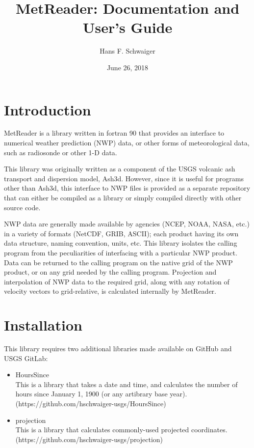 \documentclass[11pt]{article}   %
\begin{document}
\title{MetReader: Documentation and User's Guide}   %
\author{Hans F. Schwaiger}
\date{June 26, 2018}    %
\maketitle

\section{Introduction}
MetReader is a library written in fortran 90 that provides an interface to
numerical weather prediction (NWP) data, or other forms of meteorological
data, such as radiosonde or other 1-D data.

This library was originally written as a component of the USGS volcanic ash
transport and dispersion model, Ash3d.  However, since it is useful for
programs other than Ash3d, this interface to NWP files is provided
as a separate repository that can either be compiled as a library or simply
compiled directly with other source code.

NWP data are generally made available by agencies (NCEP, NOAA, NASA, etc.)
in a variety of formats (NetCDF, GRIB, ASCII); each product having
its own data structure, naming convention, units, etc.  This library
isolates the calling program from the peculiarities of interfacing with
a particular NWP product.  Data can be returned to the calling program on
the native grid of the NWP product, or on any grid needed by the calling
program.  Projection and interpolation of NWP data to the required grid, along
with any rotation of velocity vectors to grid-relative, is calculated internally by
MetReader.

\section{Installation}
This library requires two additional libraries made available on GitHub and USGS GitLab:
\begin{itemize}
\item HoursSince \\
This is a library that takes a date and time, and calculates the number of hours
since January 1, 1900 (or any artibrary base year).\\
(https://github.com/hschwaiger-usgs/HoursSince)
\item projection \\
This is a library that calculates commonly-used projected coordinates.\\
(https://github.com/hschwaiger-usgs/projection)
\end{itemize}
\end{document}

